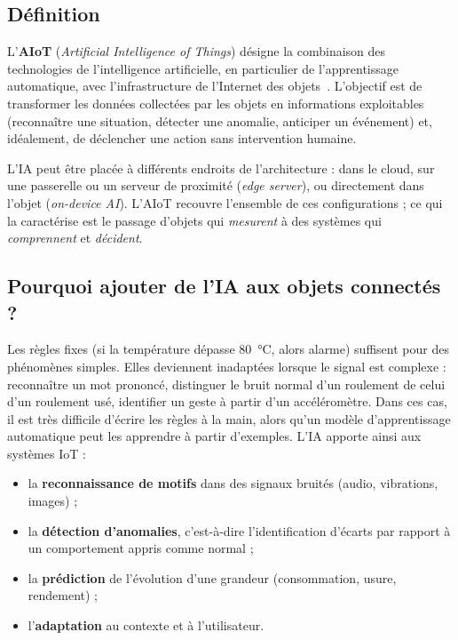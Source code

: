 \subsection{Définition}

L'\textbf{AIoT} (\emph{Artificial Intelligence of Things}) désigne la
combinaison des technologies de l'intelligence artificielle, en particulier de
l'apprentissage automatique, avec l'infrastructure de l'Internet des
objets~\cite{zhang2021aiot}. L'objectif est de transformer les données
collectées par les objets en informations exploitables (reconnaître une
situation, détecter une anomalie, anticiper un événement) et, idéalement, de
déclencher une action sans intervention humaine.

L'IA peut être placée à différents endroits de l'architecture : dans le
cloud, sur une passerelle ou un serveur de proximité (\emph{edge server}), ou
directement dans l'objet (\emph{on-device AI}). L'AIoT recouvre l'ensemble de
ces configurations ; ce qui la caractérise est le passage d'objets qui
\emph{mesurent} à des systèmes qui \emph{comprennent} et \emph{décident}.

\subsection{Pourquoi ajouter de l'IA aux objets connectés ?}

Les règles fixes (\og si la température dépasse 80~°C, alors alarme\fg{})
suffisent pour des phénomènes simples. Elles deviennent inadaptées lorsque le
signal est complexe : reconnaître un mot prononcé, distinguer le bruit normal
d'un roulement de celui d'un roulement usé, identifier un geste à partir d'un
accéléromètre. Dans ces cas, il est très difficile d'écrire les règles à la
main, alors qu'un modèle d'apprentissage automatique peut les apprendre à
partir d'exemples. L'IA apporte ainsi aux systèmes IoT :
\begin{itemize}
  \item la \textbf{reconnaissance de motifs} dans des signaux bruités (audio,
        vibrations, images) ;
  \item la \textbf{détection d'anomalies}, c'est-à-dire l'identification
        d'écarts par rapport à un comportement appris comme normal ;
  \item la \textbf{prédiction} de l'évolution d'une grandeur (consommation,
        usure, rendement) ;
  \item l'\textbf{adaptation} au contexte et à l'utilisateur.
\end{itemize}

